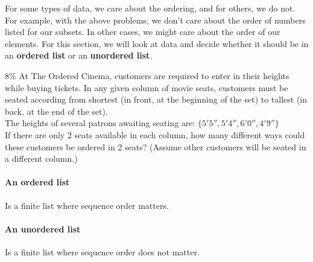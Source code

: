 \documentclass[a4paper,12pt]{book}
\begin{document}
        \begin{introNOHEAD}
            For some types of data, we care about the ordering, and for
            others, we do not. For example, with the above problems,
            we don't care about the order of numbers listed for our subsets.
            In other cases, we might care about the order of our elements.
            For this section, we will look at data and decide whether it
            should be in an \textbf{ordered list} or an \textbf{unordered list}.
        \end{introNOHEAD}

        \begin{question}{2}{8\%}
            At The Ordered Cinema, customers are required to enter in
            their heights while buying tickets.
            In any given column of movie seats, customers must be seated
            according from shortest (in front, at the beginning of the set) to tallest (in back, at the end of the set).
            ~\\

            The heights of several patrons awaiting seating are: 
            $\{ 5'5'', 5'4'', 6'0'', 4'9'' \}$
            ~\\
            
            If there are only 2 seats available in each column,
                how many different ways could these customers be ordered in 2 seats?
                (Assume other customers will be seated in a different column.)
                ~\\
        \end{question}

        
        \begin{introNOHEAD}
            \paragraph{An ordered list}
                Is a finite list where sequence order matters.
            
            \paragraph{An unordered list}
                Is a finite list where sequence order does not matter.
        \end{introNOHEAD}

    
\end{document}
